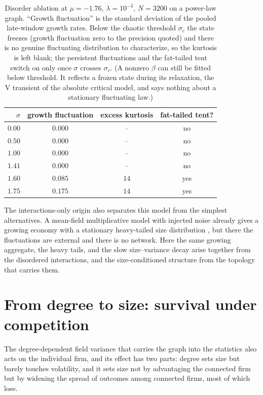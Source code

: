 \begin{table}[h]
    \centering
    \begin{tabular}{rccc}
        \hline
        $\sigma$ & growth fluctuation & excess kurtosis & fat-tailed tent? \\
        \hline
        $0.00$ & $0.000$ & --   & no  \\
        $0.50$ & $0.000$ & --   & no  \\
        $1.00$ & $0.000$ & --   & no  \\
        $1.41$ & $0.000$ & --   & no  \\
        $1.60$ & $0.085$ & $14$ & yes \\
        $1.75$ & $0.175$ & $14$ & yes \\
        \hline
    \end{tabular}
    \caption{Disorder ablation at $\mu = -1.76$, $\lambda = 10^{-3}$, $N = 3200$ on a
    power-law graph. ``Growth fluctuation'' is the standard deviation of the pooled
    late-window growth rates. Below the chaotic threshold $\sigma_c$ the state
    freezes (growth fluctuation zero to the precision quoted) and there is no genuine
    fluctuating distribution to characterize, so the kurtosis is left blank; the
    persistent fluctuations and the fat-tailed tent switch on only once $\sigma$ crosses
    $\sigma_c$. (A nonzero $\beta$ can still be fitted below threshold. It reflects a frozen
    state during its relaxation, the V transient of the absolute critical model, and says
    nothing about a stationary fluctuating law.)}
    \label{tab:growing-ablation}
\end{table}

The interactions-only origin also separates this model from the simplest alternatives. A
mean-field multiplicative model with injected noise already gives a growing economy with a
stationary heavy-tailed size distribution \citep{bouchaudmezard2000}, but there the
fluctuations are external and there is no network. Here the same growing aggregate, the heavy tails,
and the slow size--variance decay arise together from the disordered
interactions, and the size-conditioned structure from the topology that carries them.

\section{From degree to size: survival under competition}
\label{sec:growing-degree-size}

The degree-dependent field variance that carries the graph into the statistics also
acts on the individual firm, and its effect has two parts: degree sets size but barely
touches volatility, and it sets size not by advantaging the connected firm but by
widening the spread of outcomes among connected firms, most of which lose.

